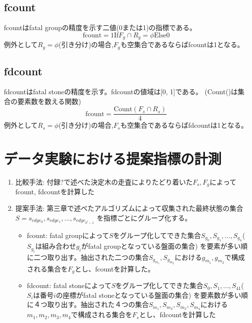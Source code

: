 \subsection{fcount}
fcountはfatal groupの精度を示す二値(0または1)の指標である。
\begin{equation}
	{\textrm{fcount} = 1 \textrm{If} F_g \cap R_g = \phi \textrm{Else} 0}
\end{equation}
例外として$R_g=\phi$(引き分け)の場合,$F_g$も空集合であるならばfcountは1となる。
\subsection{fdcount}
fdcountはfatal stoneの精度を示す。fdcountの値域は[0, 1]である。
(Count()は集合の要素数を数える関数)
\begin{equation}
	{\textrm{fcount} = \frac{\textrm{Count}(F_s \cap R_s)}{4}  }
\end{equation}
例外として$R_s=\phi$(引き分け)の場合,$F_s$も空集合であるならばfdcountは1となる。
\section{データ実験における提案指標の計測}

\begin{enumerate}
	\item 比較手法: 付録?で述べた決定木の走査によりたどり着いた$F_s, F_g$によってfcount, fdcountを計算した
	\item 提案手法: 第三章で述べたアルゴリズムによって収集された最終状態の集合$S={s_{edge_0}, s_{edge_1}, ..., s_{edge_{k^l-1}}}$
	    を指標ごとにグループ化する。
		\begin{itemize}
			\item fcount: fatal groupによって$S$をグループ化してできた集合${S_{g_0}, S_{g_1}, ..., S_{g_n}}$($S_{g_i}$は組み合わせ$g_i$がfatal groupとなっている盤面の集合)
			を要素が多い順に二つ取り出す。抽出された二つの集合${S_{g_{m_1}}, S_{g_{m_2}}}$における${g_{m_1}, g_{m_2}}$で構成される集合を$F_g$とし、fcountを計算した。
			\item fdcount: fatal stoneによって$S$をグループ化してできた集合${S_0, S_1, ..., S_41}$($S_i$は番号$i$の座標がfatal stoneとなっている盤面の集合)
			を要素数が多い順に４つ取り出す。抽出された４つの集合${S_{m_1}, S_{m_2}, S_{m_3}, S_{m_4}}$における${m_1, m_2, m_3, m_4}$で構成される集合を$F_s$とし、fdcountを計算した
		\end{itemize}
\end{enumerate}

